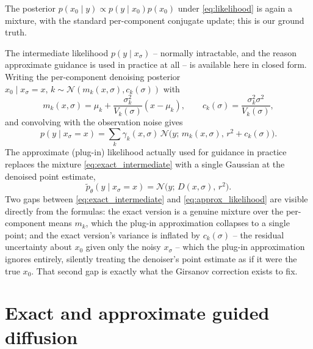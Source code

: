 \documentclass[english,10pt]{article}
\numberwithin{equation}{section}
\begin{document}
The posterior $p(x_0\mid y)\propto p(y\mid x_0)p(x_0)$ under
\eqref{eq:likelihood} is again a mixture, with the standard per-component
conjugate update; this is our ground truth.

The intermediate likelihood $p(y\mid x_\sigma)$ -- normally intractable, and
the reason approximate guidance is used in practice at all -- is available
here in closed form. Writing the per-component denoising posterior
$x_0\mid x_\sigma=x,\,k\sim\mathcal N(m_k(x,\sigma),c_k(\sigma))$ with
\begin{equation}
m_k(x,\sigma)=\mu_k+\frac{\sigma_k^2}{V_k(\sigma)}(x-\mu_k), \qquad
c_k(\sigma)=\frac{\sigma_k^2\sigma^2}{V_k(\sigma)},
\label{eq:denoising_posterior}
\end{equation}
and convolving with the observation noise gives
\begin{equation}
p(y\mid x_\sigma=x) = \sum_k \gamma_k(x,\sigma)\,\mathcal N\big(y;\,m_k(x,\sigma),\,r^2+c_k(\sigma)\big).
\label{eq:exact_intermediate}
\end{equation}
The approximate (plug-in) likelihood actually used for guidance in practice
replaces the mixture \eqref{eq:exact_intermediate} with a single Gaussian at
the denoised point estimate,
\begin{equation}
\tilde p_\theta(y\mid x_\sigma=x) = \mathcal N\big(y;\,D(x,\sigma),\,r^2\big).
\label{eq:approx_likelihood}
\end{equation}
Two gaps between \eqref{eq:exact_intermediate} and \eqref{eq:approx_likelihood}
are visible directly from the formulas: the exact version is a genuine mixture
over the per-component means $m_k$, which the plug-in approximation collapses
to a single point; and the exact version's variance is inflated by
$c_k(\sigma)$ -- the residual uncertainty about $x_0$ given only the noisy
$x_\sigma$ -- which the plug-in approximation ignores entirely, silently
treating the denoiser's point estimate as if it were the true $x_0$. That
second gap is exactly what the Girsanov correction exists to fix.

\section{Exact and approximate guided diffusion}
\label{sec:guided}
\end{document}
